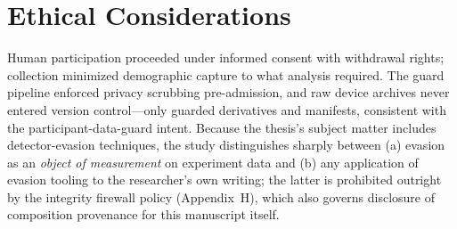 \section{Ethical Considerations}
Human participation proceeded under informed consent with withdrawal rights;
collection minimized demographic capture to what analysis required. The
guard pipeline enforced privacy scrubbing pre-admission, and raw device
archives never entered version control---only guarded derivatives and
manifests, consistent with the participant-data-guard intent. Because the
thesis's subject matter includes detector-evasion techniques, the study
distinguishes sharply between (a) evasion as an \emph{object of
measurement} on experiment data and (b) any application of evasion tooling
to the researcher's own writing; the latter is prohibited outright by the
integrity firewall policy (Appendix~H), which also governs disclosure of
composition provenance for this manuscript itself.